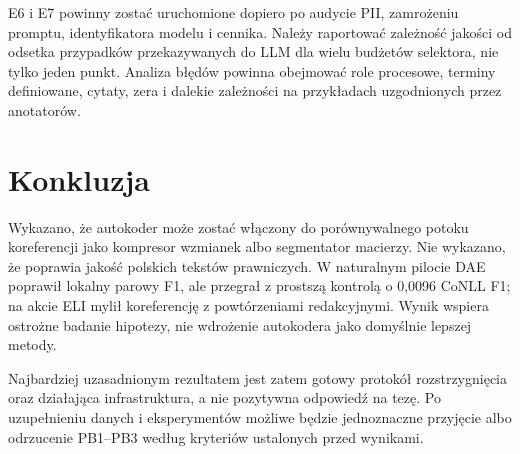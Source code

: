 E6 i E7 powinny zostać uruchomione dopiero po audycie PII, zamrożeniu promptu, identyfikatora modelu i cennika. Należy raportować zależność jakości od odsetka przypadków przekazywanych do LLM dla wielu budżetów selektora, nie tylko jeden punkt. Analiza błędów powinna obejmować role procesowe, terminy definiowane, cytaty, zera i dalekie zależności na przykładach uzgodnionych przez anotatorów.

\section{Konkluzja}

Wykazano, że autokoder może zostać włączony do porównywalnego potoku koreferencji jako kompresor wzmianek albo segmentator macierzy. Nie wykazano, że poprawia jakość polskich tekstów prawniczych. W naturalnym pilocie DAE poprawił lokalny parowy F1, ale przegrał z prostszą kontrolą o 0,0096 CoNLL F1; na akcie ELI mylił koreferencję z powtórzeniami redakcyjnymi. Wynik wspiera ostrożne badanie hipotezy, nie wdrożenie autokodera jako domyślnie lepszej metody.

Najbardziej uzasadnionym rezultatem jest zatem gotowy protokół rozstrzygnięcia oraz działająca infrastruktura, a nie pozytywna odpowiedź na tezę. Po uzupełnieniu danych i eksperymentów możliwe będzie jednoznaczne przyjęcie albo odrzucenie PB1--PB3 według kryteriów ustalonych przed wynikami.
